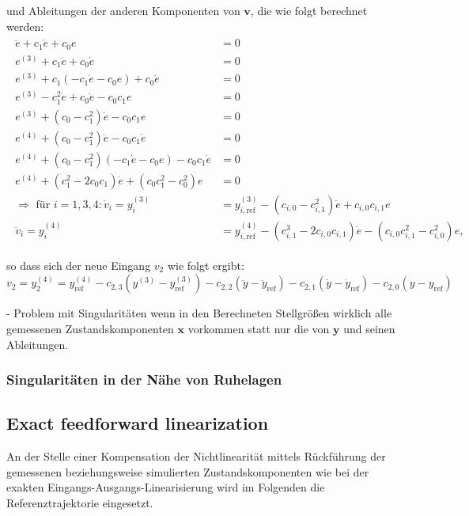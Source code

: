 und Ableitungen der anderen Komponenten von $\pmb{v}$, die wie folgt berechnet werden:
\begin{align}
	\begin{split}
	    \ddot{e} + c_1 \dot{e} + c_0 e &= 0 \\
		e^{(3)} + c_1 \ddot{e} + c_0 \dot{e} &= 0 \\
		e^{(3)} + c_1 (-c_1 \dot{e} - c_0 e) + c_0 \dot{e} &= 0 \\
		e^{(3)} - c_1^2 \dot{e} + c_0 \dot{e} - c_0 c_1 e &= 0 \\
		e^{(3)} + (c_0 - c_1^2) \dot{e} - c_0 c_1 e &= 0 \\
		e^{(4)} + (c_0 - c_1^2) \ddot{e} - c_0 c_1 \dot{e} &= 0 \\
		e^{(4)} + (c_0 - c_1^2) (-c_1 \dot{e} - c_0 e) - c_0 c_1 \dot{e} &= 0 \\
		e^{(4)} + (c_1^2 - 2 c_0 c_1) \dot{e} + (c_0 c_1^2 - c_0^2) e &= 0 \\
		\Rightarrow \text{ für } i = 1,3,4: \dot{v}_i = y_i^{(3)} &= y_{i, \text{ref}}^{(3)} - (c_{i, 0} - c_{i, 1}^2) \dot{e} + c_{i, 0} c_{i, 1} e \\
		\ddot{v}_i = y_i^{(4)} &= y_{i, \text{ref}}^{(4)} - (c_{i, 1}^3 - 2 c_{i, 0} c_{i, 1}) \dot{e} - (c_{i, 0} c_{i, 1}^2 - c_{i, 0}^2) e,
	\end{split}
\end{align}

so dass sich der neue Eingang $v_2$ wie folgt ergibt:
\begin{equation}
	v_2 = y_2^{(4)} = y_{\text{ref}}^{(4)} - c_{2, 3} (y^{(3)} - y_{\text{ref}}^{(3)}) - c_{2, 2} (\ddot{y} - \ddot{y}_{\text{ref}}) - c_{2, 1} (\dot{y} - \dot{y}_{\text{ref}}) - c_{2, 0} (y - y_{\text{ref}})
\end{equation} 

- Problem mit Singularitäten wenn in den Berechneten Stellgrößen wirklich alle gemessenen Zustandskomponenten $\pmb{x}$ vorkommen statt nur die von $\pmb{y}$ und seinen Ableitungen.

\subsubsection{Singularitäten in der Nähe von Ruhelagen}

\subsection{Exact feedforward linearization}
An der Stelle einer Kompensation der Nichtlinearität mittels Rückführung der gemessenen beziehungsweise simulierten Zustandskomponenten wie bei der exakten Eingangs-Ausgangs-Linearisierung wird im Folgenden die Referenztrajektorie eingesetzt. \cite{Hagenmeyer2003}

